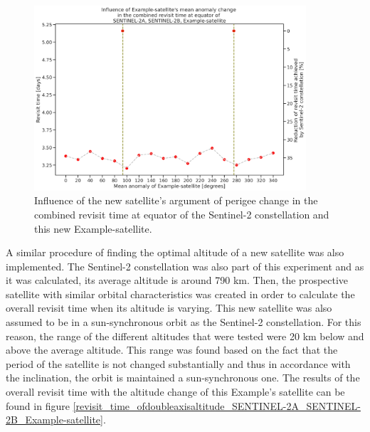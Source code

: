 \begin{figure}
\centering
\includegraphics[width=0.9\textwidth]{Images/revisit_time_ofdoubleaxis_SENTINEL-2A_SENTINEL-2B_Example-satellite.png}
\caption{Influence of the new satellite's argument of perigee change in the combined revisit time at equator of the Sentinel-2 constellation and this new Example-satellite.}
\label{revisit_time_ofdoubleaxis_SENTINEL-2A_SENTINEL-2B_Example-satellite}
\end{figure}


A similar procedure of finding the optimal altitude of a new satellite was also implemented. The Sentinel-2 constellation was also part of this experiment and as it was calculated, its average altitude is around 790 km. Then, the prospective satellite with similar orbital characteristics was created in order to calculate the overall revisit time when its altitude is varying. This new satellite was also assumed to be in a sun-synchronous orbit as the Sentinel-2 constellation. For this reason, the range of the different altitudes that were tested were 20 km below and above the average altitude. This range was found based on the fact that the period of the satellite is not changed substantially and thus in accordance with the inclination, the orbit is maintained a sun-synchronous one. The results of the overall revisit time with the altitude change of this Example's satellite can be found in figure \ref{revisit_time_ofdoubleaxisaltitude_SENTINEL-2A_SENTINEL-2B_Example-satellite}.

